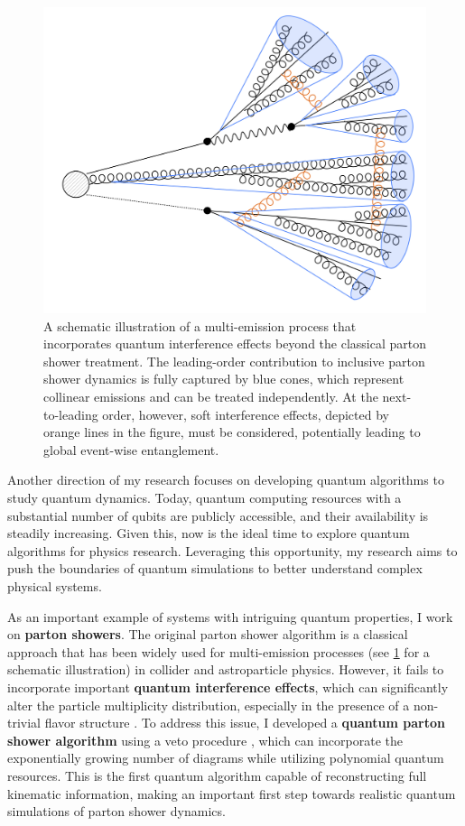 \documentclass[12pt]{article}
\begin{document}
\begin{figure}[t]
  \centering
  \includegraphics[width=0.6\hsize]{../public/rs/shower_annotated.png}
  \caption{
    A schematic illustration of a multi-emission process that incorporates quantum interference effects beyond the classical parton shower treatment.
    The leading-order contribution to inclusive parton shower dynamics is fully captured by blue cones, which represent collinear emissions and can be treated independently.
    At the next-to-leading order, however, soft interference effects, depicted by orange lines in the figure, must be considered, potentially leading to global event-wise entanglement.
  }
  \label{fig:shower}
\end{figure}

Another direction of my research focuses on developing quantum algorithms to study quantum dynamics.
Today, quantum computing resources with a substantial number of qubits are publicly accessible, and their availability is steadily increasing.
Given this, now is the ideal time to explore quantum algorithms for physics research.
Leveraging this opportunity, my research aims to push the boundaries of quantum simulations to better understand complex physical systems.

As an important example of systems with intriguing quantum properties, I work on \textbf{parton showers}.
The original parton shower algorithm is a classical approach that has been widely used for multi-emission processes (see \cref{fig:shower} for a schematic illustration) in collider and astroparticle physics.
However, it fails to incorporate important \textbf{quantum interference effects}, which can significantly alter the particle multiplicity distribution, especially in the presence of a non-trivial flavor structure \cite{Chigusa:2022act}.
To address this issue, I developed a \textbf{quantum parton shower algorithm} using a veto procedure \cite{Bauer:2023ujy}, which can incorporate the exponentially growing number of diagrams while utilizing polynomial quantum resources.
This is the first quantum algorithm capable of reconstructing full kinematic information, making an important first step towards realistic quantum simulations of parton shower dynamics.
\end{document}

